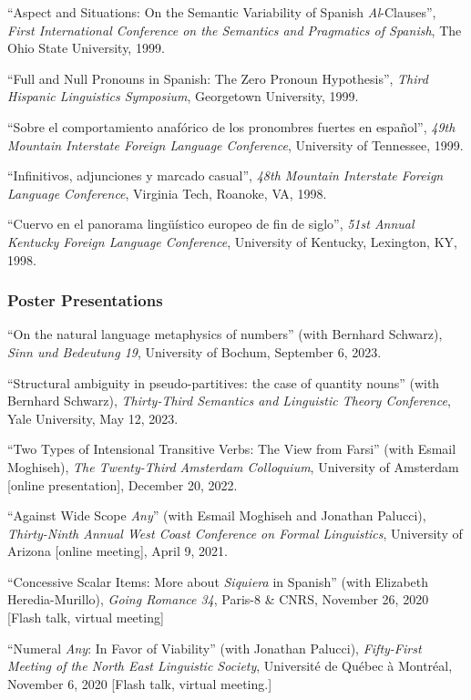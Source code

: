 \documentclass[11pt]{article}
\begin{document}
``Aspect and Situations: On the Semantic Variability of Spanish \textit{Al}-Clauses'', \textit{First International Conference on the Semantics and Pragmatics of Spanish}, The Ohio State University, 1999. 

``Full and Null Pronouns in Spanish: The Zero Pronoun Hypothesis'', \textit{Third Hispanic Linguistics Symposium}, Georgetown University, 1999. 

``Sobre el comportamiento anaf\'orico de los pronombres fuertes en espa\~nol'', \textit{49th Mountain Interstate Foreign Language Conference}, University of Tennessee, 1999. 

``Infinitivos, adjunciones y marcado casual'', \textit{48th Mountain Interstate Foreign Language Conference}, Virginia Tech, Roanoke, VA, 1998. 

``Cuervo en el panorama ling\"{u}\'istico europeo de fin de siglo'', \textit{51st Annual Kentucky Foreign Language Conference}, University of Kentucky, Lexington, KY, 1998. 

\subsubsection*{Poster Presentations}

``On the natural language metaphysics of numbers'' (with Bernhard Schwarz), \textit{Sinn und Bedeutung 19}, University of Bochum, September 6, 2023.

``Structural ambiguity in pseudo-partitives:
the case of quantity nouns'' (with Bernhard Schwarz), \textit{Thirty-Third Semantics and Linguistic Theory Conference}, Yale University, May 12, 2023.


``Two Types of Intensional Transitive Verbs: The View from Farsi'' (with Esmail Moghiseh), \textit{The Twenty-Third Amsterdam Colloquium}, University of Amsterdam [online presentation], December 20, 2022.

``Against Wide Scope \textit{Any}'' (with Esmail Moghiseh and Jonathan Palucci), \textit{Thirty-Ninth Annual West Coast Conference on Formal Linguistics}, University of Arizona [online meeting], April 9, 2021.

``Concessive Scalar Items: More about \textit{Siquiera} in Spanish'' (with Elizabeth Heredia-Murillo),
\textit{Going Romance 34}, Paris-8 \& CNRS, November 26, 2020 [Flash talk, virtual meeting]

``Numeral
\textit{Any}: In Favor of Viability'' (with Jonathan Palucci),  \textit{Fifty-First Meeting of the
  North East Linguistic Society}, Universit\'e de Qu\'ebec \`a
Montr\'eal, November 6, 2020 [Flash talk, virtual meeting.]
\end{document}
